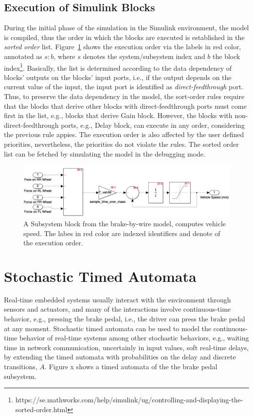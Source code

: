 \subsection*{Execution of Simulink Blocks}
During the initial phase of the simulation in the Simulink environment, the model is compiled, thus the order in which the blocks are executed is established in the \textit{sorted order} list. Figure~\ref{fig_sm_exec_order} shows the execution order via the labels in red color, annotated as $s:b$, where $s$ denotes the system/subsystem index and $b$ the block index\footnote{https://se.mathworks.com/help/simulink/ug/controlling-and-displaying-the-sorted-order.html}. Basically, the list is determined according to the data dependency of blocks' outputs on the blocks' input ports, i.e., if the output depends on the current value of the input, the input port is identified as \textit{direct-feedthrough} port. Thus, to preserve the data dependency in the model, the sort-order rules require that the blocks that derive other blocks with direct-feedthrough ports must come first in the list, e.g., blocks that derive Gain block. However, the blocks with non-direct-feedthrough ports, e.g., Delay block, can execute in any order, considering the previous rule appies. The execution order is also affected by the user defined priorities, nevertheless, the priorities do not violate the rules. The sorted order list can be fetched by simulating the model in the debugging mode.
\begin{figure}
	\centering
	\includegraphics[width=1\linewidth]{images/sm_exec_order}
	\caption{A Subsystem block from the brake-by-wire model, computes vehicle speed. The labes in red color are indexed identifiers and denote of the execution order.}
	\label{fig_sm_exec_order}
\end{figure}

\section{Stochastic Timed Automata}
Real-time embedded systems usually interact with the environment through sensors and actuators, and many of the interactions involve continuous-time behavior, e.g., pressing the brake pedal, i.e., the driver can press the brake pedal at any moment. Stochastic timed automata can be used to model the continuous-time behavior of real-time systems among other stochastic behaviors, e.g., waiting time in network communication, uncertainly in input values, soft real-time delays, by extending the timed automata with probabilities on the delay and discrete transitions, $A$. Figure x shows a timed automata of the the brake pedal subsystem. 


